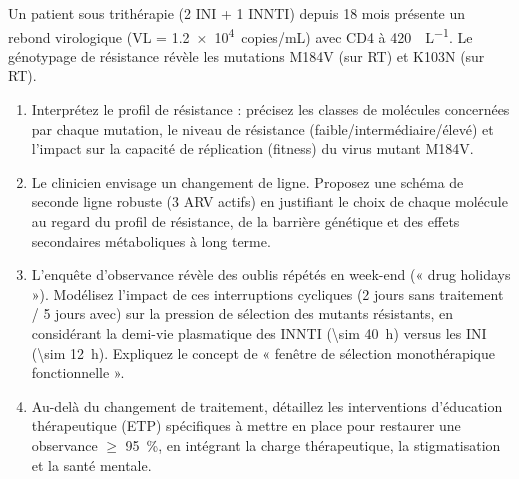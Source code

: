 \documentclass[11pt]{article}
\begin{document}
\begin{exercice}
Un patient sous trithérapie (2 INI + 1 INNTI) depuis 18 mois présente un rebond virologique (VL = \SI{1,2e4}{copies/mL}) avec CD4 à \SI{420}{\mu L^{-1}}. Le génotypage de résistance révèle les mutations M184V (sur RT) et K103N (sur RT).

\begin{enumerate}
    \item Interprétez le profil de résistance : précisez les classes de molécules concernées par chaque mutation, le niveau de résistance (faible/intermédiaire/élevé) et l'impact sur la capacité de réplication (fitness) du virus mutant M184V.
    \item Le clinicien envisage un changement de ligne. Proposez une schéma de seconde ligne robuste (3 ARV actifs) en justifiant le choix de chaque molécule au regard du profil de résistance, de la barrière génétique et des effets secondaires métaboliques à long terme.
    \item L'enquête d'observance révèle des oublis répétés en week-end (« drug holidays »). Modélisez l'impact de ces interruptions cycliques (2 jours sans traitement / 5 jours avec) sur la pression de sélection des mutants résistants, en considérant la demi-vie plasmatique des INNTI (\SI{\sim 40}{h}) versus les INI (\SI{\sim 12}{h}). Expliquez le concept de « fenêtre de sélection monothérapique fonctionnelle ».
    \item Au-delà du changement de traitement, détaillez les interventions d'éducation thérapeutique (ETP) spécifiques à mettre en place pour restaurer une observance $\ge$ \SI{95}{\%}, en intégrant la charge thérapeutique, la stigmatisation et la santé mentale.
\end{enumerate}
\end{exercice}
\end{document}

